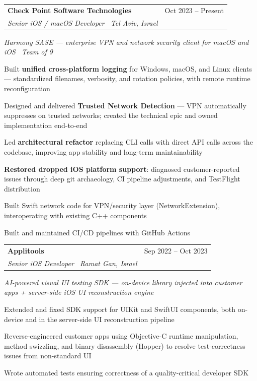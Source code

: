 \documentclass[10pt,a4paper]{article}
\makeatletter
\newcommand{\jobheader}[4]{%
  \vspace{1pt}%
  \noindent
  \begin{tabularx}{\textwidth}{@{}Xr@{}}
    {\bfseries\color{black} #1} & {\small\color{midgray} #4} \\[-2pt]
    {\small\itshape\color{midgray} #2 \textbullet\ #3} & \\
  \end{tabularx}%
  \vspace{0pt}%
}
\newlength{\cvitemsep}\setlength{\cvitemsep}{0.5pt}
\newlength{\cvtopsep}\setlength{\cvtopsep}{1pt}
\newlength{\cvparsep}\setlength{\cvparsep}{0pt}
\renewenvironment{itemize}{%
  \begin{list}{\small\textbullet}{%
      \setlength{\leftmargin}{1.4em}%
      \setlength{\labelwidth}{1em}%
      \setlength{\labelsep}{0.4em}%
      \setlength{\itemsep}{\cvitemsep}%
      \setlength{\topsep}{\cvtopsep}%
      \setlength{\parsep}{\cvparsep}%
      \setlength{\partopsep}{0pt}%
    }%
}{%
  \end{list}%
}
\makeatother
\begin{document}
\jobheader{Check Point Software Technologies}{Senior iOS / macOS Developer}{Tel Aviv, Israel}{Oct 2023 – Present}
{\small\color{midgray}\itshape
  Harmony SASE — enterprise VPN and network security client for macOS and iOS \textbullet\ Team of 9
}
\begin{itemize}
  \item Built \textbf{unified cross-platform logging} for Windows, macOS, and Linux clients —
        standardized filenames, verbosity, and rotation policies, with remote runtime reconfiguration
  \item Designed and delivered \textbf{Trusted Network Detection} — VPN automatically suppresses on
        trusted networks; created the technical epic and owned implementation end-to-end
  \item Led \textbf{architectural refactor} replacing CLI calls with direct API calls across the
        codebase, improving app stability and long-term maintainability
  \item \textbf{Restored dropped iOS platform support}: diagnosed customer-reported issues through
        deep git archaeology, CI pipeline adjustments, and TestFlight distribution
  \item Built Swift network code for VPN/security layer (NetworkExtension), interoperating
        with existing C++ components
  \item Built and maintained CI/CD pipelines with GitHub Actions
\end{itemize}

\jobheader{Applitools}{Senior iOS Developer}{Ramat Gan, Israel}{Sep 2022 – Oct 2023}
{\small\color{midgray}\itshape
  AI-powered visual UI testing SDK — on-device library injected into customer apps + server-side iOS UI reconstruction engine
}
\begin{itemize}
  \item Extended and fixed SDK support for UIKit and SwiftUI components, both on-device and in the
        server-side UI reconstruction pipeline
  \item Reverse-engineered customer apps using Objective-C runtime manipulation, method swizzling,
        and binary disassembly (Hopper) to resolve test-correctness issues from non-standard UI
  \item Wrote automated tests ensuring correctness of a quality-critical developer SDK
\end{itemize}
\end{document}
